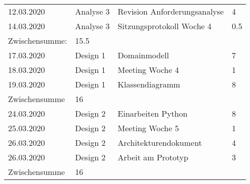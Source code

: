 \documentclass[
	ngerman,
	toc=listof, %
	toc=bibliography, %
	footnotes=multiple, %
	parskip=half, %
	numbers=noendperiod %
]{scrartcl}
\begin{document}
\begin{tabularx}{\textwidth}{llXl}
		12.03.2020 & Analyse 3 & Revision Anforderungsanalyse & 4 \\
		14.03.2020 & Analyse 3 & Sitzungsprotokoll Woche 4 & 0.5 \\
		\midrule
		Zwischensumme: & 15.5 & & \\
		\midrule
		17.03.2020 & Design 1 & Domainmodell & 7 \\
		18.03.2020 & Design 1 & Meeting Woche 4 & 1 \\
		19.03.2020 & Design 1 & Klassendiagramm & 8 \\
		\midrule
		Zwischensumme & 16 & & \\
		\midrule
		24.03.2020 & Design 2 & Einarbeiten Python & 8 \\
		25.03.2020 & Design 2 & Meeting Woche 5 & 1 \\
		26.03.2020 & Design 2 & Architekturendokument & 4 \\
		26.03.2020 & Design 2 & Arbeit am Prototyp & 3 \\
		\midrule
		Zwischensumme & 16 & & \\
		\bottomrule
	\end{tabularx}
\end{document}
